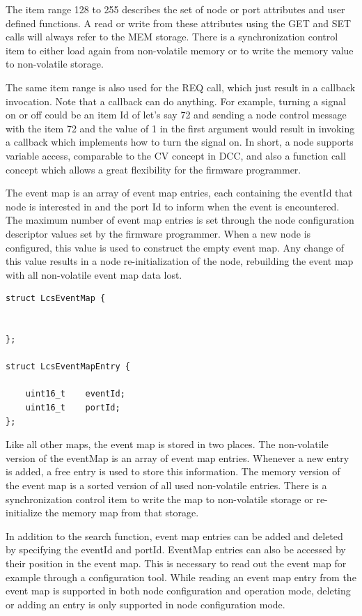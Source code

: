 The item range 128 to 255 describes the set of node or port attributes and user defined functions. A read or write from these attributes using the GET and SET calls will always refer to the MEM storage. There is a synchronization control item to either load again from non-volatile memory or to write the memory value to non-volatile storage. 

The same item range is also used for the REQ call, which just result in a callback invocation. Note that a callback can do anything. For example, turning a signal on or off could be an item Id of let's say 72 and sending a node control message with the item 72 and the value of 1 in the first argument would result in invoking a callback which implements how to turn the signal on. In short, a node supports variable access, comparable to the CV concept in DCC, and also a function call concept which allows a great flexibility for the firmware programmer.


The event map is an array of event map entries, each containing the eventId that node is interested in and the port Id to inform when the event is encountered. The maximum number of event map entries is set through the node configuration descriptor values set by the firmware programmer. When a new node is configured, this value is used to construct the empty event map. Any change of this value results in a node re-initialization of the node, rebuilding the event map with all non-volatile event map data lost.

\lstset{language=c++, style=codesnippetstyle}
\begin{lstlisting}
struct LcsEventMap {


};

struct LcsEventMapEntry {

    uint16_t	eventId;
    uint16_t 	portId;
};
\end{lstlisting}
\FloatBarrier

Like all other maps, the event map is stored in two places. The non-volatile version of the eventMap is an array of event map entries. Whenever a new entry is added, a free entry is used to store this information. The memory version of the event map is a sorted version of all used non-volatile entries. There is a synchronization control item to write the map to non-volatile storage or re-initialize the memory map from that storage.

In addition to the search function, event map entries can be added and deleted by specifying the eventId and portId. EventMap entries can also be accessed by their position in the event map. This is necessary to read out the event map for example through a configuration tool. While reading an event map entry from the event map is supported in both node configuration and operation mode, deleting or adding an entry is only supported in node configuration mode.

